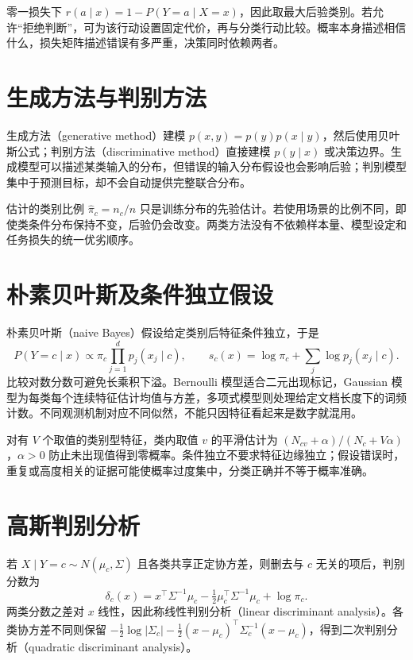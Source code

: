 \documentclass[UTF8,12pt,a4paper,fontset=fandol]{ctexbook}
\begin{document}
零一损失下 $r(a\mid x)=1-P(Y=a\mid X=x)$，因此取最大后验类别。若允许“拒绝判断”，可为该行动设置固定代价，再与分类行动比较。概率本身描述相信什么，损失矩阵描述错误有多严重，决策同时依赖两者。

\section{生成方法与判别方法}

生成方法（generative method）建模 $p(x,y)=p(y)p(x\mid y)$，然后使用贝叶斯公式；判别方法（discriminative method）直接建模 $p(y\mid x)$ 或决策边界。生成模型可以描述某类输入的分布，但错误的输入分布假设也会影响后验；判别模型集中于预测目标，却不会自动提供完整联合分布。

估计的类别比例 $\widehat\pi_c=n_c/n$ 只是训练分布的先验估计。若使用场景的比例不同，即使类条件分布保持不变，后验仍会改变。两类方法没有不依赖样本量、模型设定和任务损失的统一优劣顺序。

\section{朴素贝叶斯及条件独立假设}

朴素贝叶斯（naive Bayes）假设给定类别后特征条件独立，于是
\[
 P(Y=c\mid x)\propto\pi_c\prod_{j=1}^d p_j(x_j\mid c),\qquad
 s_c(x)=\log\pi_c+\sum_j\log p_j(x_j\mid c).
\]
比较对数分数可避免长乘积下溢。Bernoulli 模型适合二元出现标记，Gaussian 模型为每类每个连续特征估计均值与方差，多项式模型则处理给定文档长度下的词频计数。不同观测机制对应不同似然，不能只因特征看起来是数字就混用。

对有 $V$ 个取值的类别型特征，类内取值 $v$ 的平滑估计为 $(N_{cv}+\alpha)/(N_c+V\alpha)$，$\alpha>0$ 防止未出现值得到零概率。条件独立不要求特征边缘独立；假设错误时，重复或高度相关的证据可能使概率过度集中，分类正确并不等于概率准确。

\section{高斯判别分析}

若 $X\mid Y=c\sim N(\mu_c,\Sigma)$ 且各类共享正定协方差，则删去与 $c$ 无关的项后，判别分数为
\begin{equation}
 \delta_c(x)=x^\top\Sigma^{-1}\mu_c
 -\tfrac12\mu_c^\top\Sigma^{-1}\mu_c+\log\pi_c.
 \label{eq:ml-gaussian-discriminant}
\end{equation}
两类分数之差对 $x$ 线性，因此称线性判别分析（linear discriminant analysis）。各类协方差不同则保留 $-\frac12\log|\Sigma_c|-\frac12(x-\mu_c)^\top\Sigma_c^{-1}(x-\mu_c)$，得到二次判别分析（quadratic discriminant analysis）。
\end{document}
